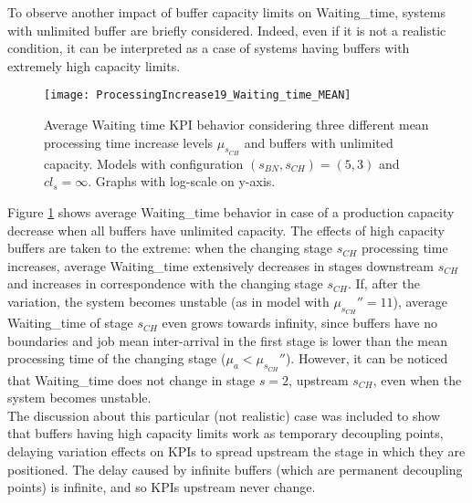 To observe another impact of buffer capacity limits on Waiting\_time, systems with unlimited buffer are briefly considered. Indeed, even if it is not a realistic condition, it can be interpreted as a case of systems having buffers with extremely high capacity limits. 
\begin{figure}[h] 
\centering
\texttt{[image: ProcessingIncrease19\_Waiting\_time\_MEAN]}
\caption[Average Waiting time KPI behavior with different processing time increase levels considering buffers with unlimited capacity]{Average Waiting time KPI behavior considering three different mean processing time increase levels $\mu_{s_{CH}}$ and buffers with unlimited capacity. Models with configuration $(s_{BN},s_{CH})=(5,3)$ and $cl_s=\infty$. Graphs with log-scale on y-axis.}
\label{fig:Average Waiting time KPI behavior with different processing time increase levels considering buffers with unlimited capacity}
\end{figure}
Figure \ref{fig:Average Waiting time KPI behavior with different processing time increase levels considering buffers with unlimited capacity} shows average Waiting\_time behavior in case of a production capacity decrease when all buffers have unlimited capacity. The effects of high capacity buffers are taken to the extreme: when the changing stage $s_{CH}$ processing time increases, average Waiting\_time extensively decreases in stages downstream $s_{CH}$ and increases in correspondence with the changing stage $s_{CH}$. If, after the variation, the system becomes unstable (as in model with $\mu_{s_{CH}}''=11$), average Waiting\_time of stage $s_{CH}$ even grows towards infinity, since buffers have no boundaries and job mean inter-arrival in the first stage is lower than the mean processing time of the changing stage ($\mu_a<\mu_{s_{CH}}''$). However, it can be noticed that Waiting\_time does not change in stage $s=2$, upstream $s_{CH}$, even when the system becomes unstable. 
\\ The discussion about this particular (not realistic) case was included to show that buffers having high capacity limits work as temporary decoupling points, delaying variation effects on KPIs to spread upstream the stage in which they are positioned. The delay caused by infinite buffers (which are permanent decoupling points) is infinite, and so KPIs upstream never change.
